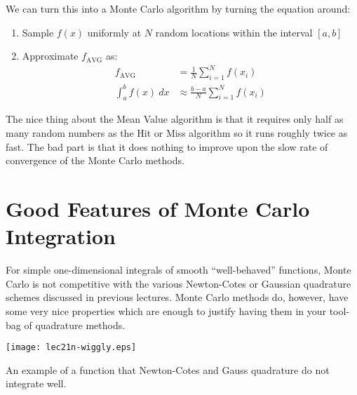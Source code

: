 \noindent We can turn this into a Monte Carlo algorithm by turning the equation around:
\begin{enumerate}
\item Sample $f(x)$ uniformly at $N$ random locations within the interval $[a,b]$
\item Approximate $f_{\text{AVG}}$ as:
\begin{align*}
f_{\text{AVG}} &= \frac{1}{N}\sum\limits_{i=1}^{N}f(x_i) \\
\int_{a}^{b} f(x) \ dx &\approx \frac{b-a}{N}\sum\limits_{i=1}^{N}f(x_i)
\end{align*}
\end{enumerate}

\noindent The nice thing about the Mean Value algorithm is that it requires only half as many random numbers as the Hit or Miss algorithm so it runs roughly twice as fast.  The bad part is that it does nothing to improve upon the slow rate of convergence of the Monte Carlo methods.  

\section{Good Features of Monte Carlo Integration}
For simple one-dimensional integrals of smooth ``well-behaved'' functions, Monte Carlo is not competitive with the various Newton-Cotes or Gaussian quadrature schemes discussed in previous lectures.  Monte Carlo methods do, however, have some very nice properties which are enough to justify having them in your tool-bag of quadrature methods.

\begin{marginfigure}
\texttt{[image: lec21n-wiggly.eps]}
\caption{An example of a function that Newton-Cotes and Gauss quadrature do not integrate well.}
\label{fig:lec21n-wiggly}
\end{marginfigure}


